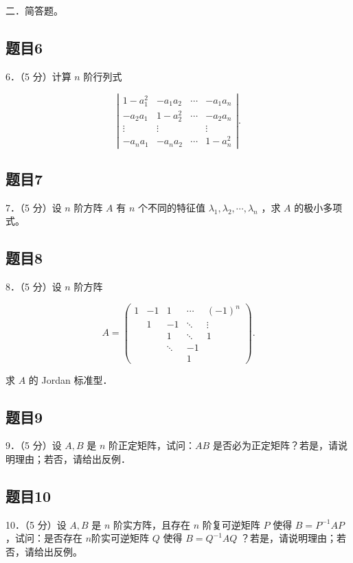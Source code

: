 \documentclass{article}
\begin{document}
二．简答题。\\

\subsection{题目6}
6．（5 分）计算 \(n\) 阶行列式

\[
\left|\begin{array}{cccc}
1-a_{1}^{2} & -a_{1} a_{2} & \cdots & -a_{1} a_{n} \\
-a_{2} a_{1} & 1-a_{2}^{2} & \cdots & -a_{2} a_{n} \\
\vdots & \vdots & & \vdots \\
-a_{n} a_{1} & -a_{n} a_{2} & \cdots & 1-a_{n}^{2}
\end{array}\right| .
\]

\subsection{题目7}
7．（5 分）设 \(n\) 阶方阵 \(A\) 有 \(n\) 个不同的特征值 \(\lambda_{1}, \lambda_{2}, \cdots, \lambda_{n}\) ，求 \(A\) 的极小多项式。

\subsection{题目8}
8．（5 分）设 \(n\) 阶方阵

\[
A=\left(\begin{array}{ccccc}
1 & -1 & 1 & \cdots & (-1)^{n} \\
& 1 & -1 & \ddots & \vdots \\
& & 1 & \ddots & 1 \\
& & \ddots & -1 \\
& & & 1
\end{array}\right) .
\]

求 \(A\) 的 Jordan 标准型．

\subsection{题目9}
9．（5 分）设 \(A, B\) 是 \(n\) 阶正定矩阵，试问：\(A B\) 是否必为正定矩阵？若是，请说明理由；若否，请给出反例．

\subsection{题目10}
10．（5 分）设 \(A, B\) 是 \(n\) 阶实方阵，且存在 \(n\) 阶复可逆矩阵 \(P\) 使得 \(B=P^{-1} A P\) ，试问：是否存在 \(n\)阶实可逆矩阵 \(Q\) 使得 \(B=Q^{-1} A Q\) ？若是，请说明理由；若否，请给出反例。
\end{document}
